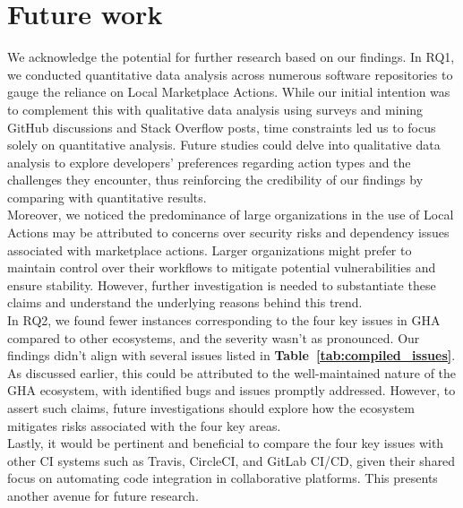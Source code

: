 \documentclass[conference]{IEEEtran}
\begin{document}
    \section{Future work}
        We acknowledge the potential for further research based on our findings. In RQ1, we conducted quantitative data analysis across numerous software repositories to gauge the reliance on Local Marketplace Actions. While our initial intention was to complement this with qualitative data analysis using surveys and mining GitHub discussions and Stack Overflow posts, time constraints led us to focus solely on quantitative analysis. Future studies could delve into qualitative data analysis to explore developers' preferences regarding action types and the challenges they encounter, thus reinforcing the credibility of our findings by comparing with quantitative results.\\
        Moreover, we noticed the predominance of large organizations in the use of Local Actions may be attributed to concerns over security risks and dependency issues associated with marketplace actions. Larger organizations might prefer to maintain control over their workflows to mitigate potential vulnerabilities and ensure stability. However, further investigation is needed to substantiate these claims and understand the underlying reasons behind this trend.\\   
        In RQ2, we found fewer instances corresponding to the four key issues in GHA compared to other ecosystems, and the severity wasn't as pronounced. Our findings didn't align with several issues listed in \textbf{Table~\ref{tab:compiled_issues}}. As discussed earlier, this could be attributed to the well-maintained nature of the GHA ecosystem, with identified bugs and issues promptly addressed. However, to assert such claims, future investigations should explore how the ecosystem mitigates risks associated with the four key areas.\\
        Lastly, it would be pertinent and beneficial to compare the four key issues with other CI systems such as Travis, CircleCI, and GitLab CI/CD, given their shared focus on automating code integration in collaborative platforms. This presents another avenue for future research.
    
\end{document}
